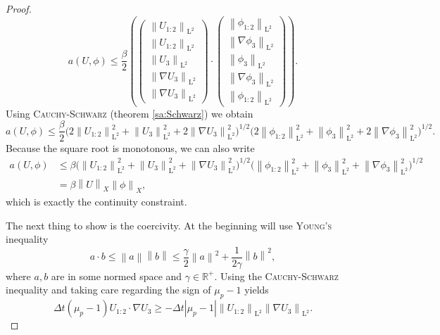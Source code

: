 \documentclass[12pt,a4paper,twoside, open=right]{scrreprt}
\theoremstyle{definition}
\theoremstyle{plain}
\newcommand{\abs}[1]{\left\vert #1\right\vert}
\newcommand{\rr}{\mathbb{R}}
\newcommand{\norm}[1]{\left\lVert#1\right\rVert}
\newcommand{\ltnorm}[1]{\norm{#1}_{\mathrm{L}^2}}
\begin{document}
\begin{proof}
    \begin{equation}
        a(U,\phi)\le \frac{\beta}{2}\left(\begin{pmatrix}
        \ltnorm{U_{1:2}}\\\ltnorm{U_{1:2}}\\\ltnorm{U_{3}}\\\ltnorm{\nabla U_{3}}\\\ltnorm{\nabla U_{3}}
        \end{pmatrix}\cdot \begin{pmatrix}
        \ltnorm{\phi_{1:2}}\\\ltnorm{\nabla\phi_{3}}\\\ltnorm{\phi_{3}}\\\ltnorm{\nabla \phi_{3}}\\\ltnorm{\phi_{1:2}}
        \end{pmatrix}\right).
    \end{equation}
    Using \textsc{Cauchy-Schwarz} (theorem \ref{sa:Schwarz}) we obtain
    \begin{equation}
        a(U,\phi)\le\frac{\beta}{2}\bigg(2\ltnorm{U_{1:2}}^2+\ltnorm{U_3}^2+2\ltnorm{\nabla U_3}^2
        \bigg)^{1/2}\bigg(2\ltnorm{\phi_{1:2}}^2+\ltnorm{\phi_3}^2+2\ltnorm{\nabla \phi_3}^2\bigg)^{1/2}.
    \end{equation}
    Because the square root is monotonous, we can also write
    \begin{align}
        a(U,\phi)&\le\beta\bigg(\ltnorm{U_{1:2}}^2+\ltnorm{U_3}^2+\ltnorm{\nabla U_3}^2
        \bigg)^{1/2}\bigg(\ltnorm{\phi_{1:2}}^2+\ltnorm{\phi_3}^2+\ltnorm{\nabla \phi_3}^2\bigg)^{1/2}\\&=\beta\norm{U}_X\norm{\phi}_X,
    \end{align}
    which is exactly the continuity constraint. 
    \par The next thing to show is the coercivity. At the beginning will use \textsc{Young's} inequality \cite{Young1912}
    \begin{equation}
        a\cdot b\le\norm{a}\norm{b}\le\frac{\gamma}{2}\norm{a}^2+\frac{1}{2\gamma}\norm{b}^2,
    \end{equation} where $a,b$ are in some normed space and $\gamma\in\rr^+$.
    Using the \textsc{Cauchy-Schwarz} inequality and taking care regarding the sign of $\mu_p-1$ yields
    \begin{equation}
        \Delta t(\mu_p-1)U_{1:2}\cdot \nabla U_3\ge -\Delta t\abs{\mu_p -1}\ltnorm{U_{1:2}}\ltnorm{\nabla U_3}.
    \end{equation}

\end{proof}
\end{document}
